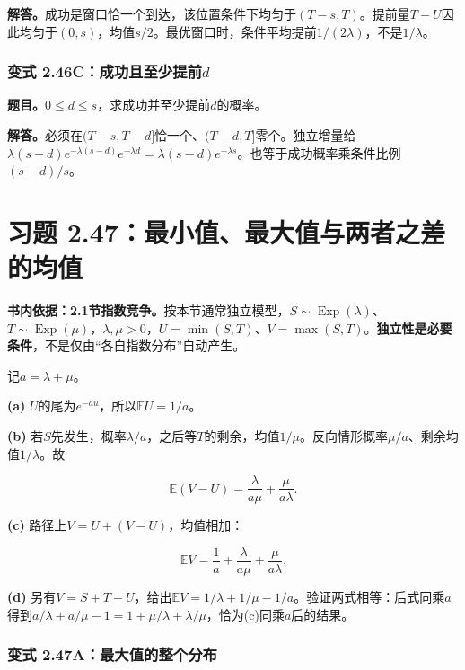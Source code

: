 \documentclass[12pt,a4paper,UTF8,fontset=fandol]{ctexart}
\begin{document}
\textbf{解答。}成功是窗口恰一个到达，该位置条件下均匀于\((T-s,T)\)。提前量\(T-U\)因此均匀于\((0,s)\)，均值\(s/2\)。最优窗口时，条件平均提前\(1/(2\lambda)\)，不是\(1/\lambda\)。

\subsubsection{\texorpdfstring{变式
2.46C：成功且至少提前\(d\)}{变式 2.46C：成功且至少提前d}}\label{ux53d8ux5f0f-2.46cux6210ux529fux4e14ux81f3ux5c11ux63d0ux524dd}

\textbf{题目。}\(0\le d\le s\)，求成功并至少提前\(d\)的概率。

\textbf{解答。}必须在\((T-s,T-d]\)恰一个、\((T-d,T]\)零个。独立增量给\(\lambda(s-d)e^{-\lambda(s-d)}e^{-\lambda d}=\lambda(s-d)e^{-\lambda s}\)。也等于成功概率乘条件比例\((s-d)/s\)。

\section{习题
2.47：最小值、最大值与两者之差的均值}\label{ux4e60ux9898-2.47ux6700ux5c0fux503cux6700ux5927ux503cux4e0eux4e24ux8005ux4e4bux5deeux7684ux5747ux503c}

\textbf{书内依据：2.1节指数竞争。}按本节通常独立模型，\(S\sim\operatorname{Exp}(\lambda)\)、\(T\sim\operatorname{Exp}(\mu)\)，\(\lambda,\mu>0\)，\(U=\min(S,T)\)、\(V=\max(S,T)\)。\textbf{独立性是必要条件}，不是仅由``各自指数分布''自动产生。

记\(a=\lambda+\mu\)。

\textbf{(a)} \(U\)的尾为\(e^{-au}\)，所以\(\boxed{\mathbb EU=1/a}\)。

\textbf{(b)}
若\(S\)先发生，概率\(\lambda/a\)，之后等\(T\)的剩余，均值\(1/\mu\)。反向情形概率\(\mu/a\)、剩余均值\(1/\lambda\)。故

\[\boxed{\mathbb E(V-U)=\frac{\lambda}{a\mu}+\frac{\mu}{a\lambda}.}\]

\textbf{(c)} 路径上\(V=U+(V-U)\)，均值相加：

\[\boxed{\mathbb EV=\frac1a+\frac{\lambda}{a\mu}+\frac{\mu}{a\lambda}.}\]

\textbf{(d)}
另有\(V=S+T-U\)，给出\(\mathbb EV=1/\lambda+1/\mu-1/a\)。验证两式相等：后式同乘\(a\)得到\(a/\lambda+a/\mu-1=1+\mu/\lambda+\lambda/\mu\)，恰为(c)同乘\(a\)后的结果。

\subsubsection{变式
2.47A：最大值的整个分布}\label{ux53d8ux5f0f-2.47aux6700ux5927ux503cux7684ux6574ux4e2aux5206ux5e03}
\end{document}

